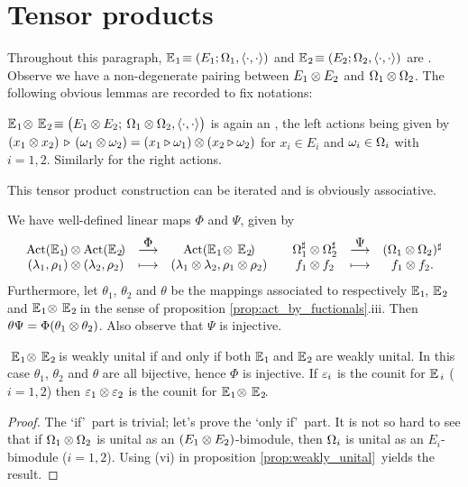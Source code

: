 \section{Tensor products}

Throughout this paragraph, $\mathbb{E}_{\hspace{0.5pt}1}\! \equiv (E_1; \Omega_1,\langle\cdot, \cdot\rangle)$ and
$\mathbb{E}_{\hspace{0.5pt}2}\! \equiv (E_2; \Omega_2,\langle\cdot, \cdot\rangle)$ are \contexts\@.
Observe we have a non-degenerate pairing between $E_1 \otimes E_2$ and $\Omega_1 \otimes \Omega_2$.
The following obvious lemmas are recorded to fix notations:

\begin{lemma_sec} \label{lem:tens_contexts_def}
  $\EEone \tens\, \EEtwo \equiv
        \left(E_1 \tens E_2; \:\Om_1 \tens \Om_2, \pairing\vertM\right)$
  is again an \context, the left actions being given by\/
  $(x_1 \otimes x_2) \,\triangleright\, (\omega_1 \otimes \omega_2)
          = (x_1 \triangleright \omega_1) \otimes (x_2 \triangleright \omega_2)  $
  for\/ $x_i \in E_i$ and $\omega_i \in \Omega_i$ with\/ $i=1,2$.
  Similarly for the right actions.
\end{lemma_sec}

This tensor product construction can be iterated and is obviously associative.

\begin{lemma_sec} \label{lem:tens_embedding}
  We have well-defined linear maps $\Phi$ and $\Psi$, given by
  $$ \begin{array}{ccccccc}
     \mbox{\rm Act}(\mathbb{E}_{\hspace{0.5pt}1}\!) \otimes \mbox{\rm Act}(\mathbb{E}_{\hspace{0.5pt}2}\!) & \stackrel{\textstyle \Phi}{\longrightarrow} &
     \mbox{\rm Act}(\mathbb{E}_{\hspace{0.5pt}1}\! \otimes\, \mathbb{E}_{\hspace{0.5pt}2}\!)
           & &
     \Omega_1^\sharp \otimes \Omega_2^\sharp & \stackrel{\textstyle \Psi}{\longrightarrow}
     & (\Omega_1 \otimes \Omega_2)^\sharp
     \\
     (\lambda_1,\rho_1) \otimes (\lambda_2,\rho_2)  & \longmapsto & (\lambda_1 \otimes \lambda_2, \rho_1 \otimes \rho_2)
           & &
     f_1 \otimes f_2 & \longmapsto & f_1 \otimes f_2.
     \end{array} $$
   Furthermore, let\/ $\theta_1$, $\theta_2$ and\/ $\theta$ be the mappings
   associated to respectively\/ $\mathbb{E}_{\hspace{0.5pt}1}\!$, $\mathbb{E}_{\hspace{0.5pt}2}\!$ and\/ $\mathbb{E}_{\hspace{0.5pt}1}\! \otimes\, \mathbb{E}_{\hspace{0.5pt}2}\!$
   in the sense of proposition \ref{prop:act_by_fuctionals}.iii.
   Then\/ $\theta\Psi = \Phi (\theta_1 \otimes \theta_2)$.
   Also observe that\/ $\Psi$ is injective.
\end{lemma_sec}


\begin{prop_sec}  \label{prop:tensor:wu}
  $\;\mathbb{E}_{\hspace{0.5pt}1}\! \otimes\, \mathbb{E}_{\hspace{0.5pt}2}\!$ is weakly unital if and only if
  both\/ $\mathbb{E}_{\hspace{0.5pt}1}\!$ and\/ $\mathbb{E}_{\hspace{0.5pt}2}\!$ are weakly unital.
\rm
  In this case $\theta_1$, $\theta_2$ and $\theta$ are all
  bijective, hence $\Phi$ is injective.
  If $\varepsilon_i$ is the counit for $\mathbb{E}_{\,i}$ ($i=1,2$)
  then $\varepsilon_1 \otimes \varepsilon_2$ is the counit for $\mathbb{E}_{\hspace{0.5pt}1}\! \otimes\, \mathbb{E}_{\hspace{0.5pt}2}\!$.
\end{prop_sec}
\begin{proof}
  The \lq if\rq\ part is trivial; let's prove the \lq only if\rq\ part.
  It is not so hard to see that if $\Omega_1 \otimes \Omega_2$ is unital as an
  $(E_1 \otimes E_2)$-bimodule, then $\Omega_i$ is unital as an $E_i$-bimodule ($i=1,2$).
  Using (vi) in proposition \ref{prop:weakly_unital}\ yields the result.
\end{proof}

